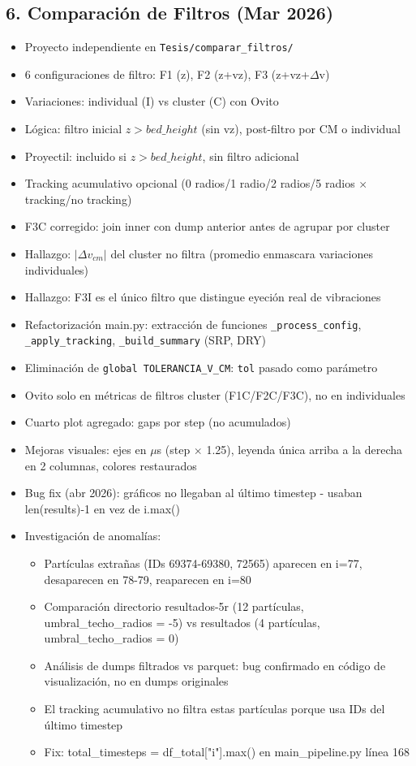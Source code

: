 \documentclass[12pt,a4paper]{article}
\begin{document}
\subsection*{6. Comparación de Filtros (Mar 2026)}
\begin{itemize}
	\item Proyecto independiente en \texttt{Tesis/comparar\_filtros/}
	\item 6 configuraciones de filtro: F1 (z), F2 (z+vz), F3 (z+vz+$\Delta$v)
	\item Variaciones: individual (I) vs cluster (C) con Ovito
	\item Lógica: filtro inicial $z > bed\_height$ (sin vz), post-filtro por CM o individual
	\item Proyectil: incluido si $z > bed\_height$, sin filtro adicional
	\item Tracking acumulativo opcional (0 radios/1 radio/2 radios/5 radios $\times$ tracking/no tracking)
	\item F3C corregido: join inner con dump anterior antes de agrupar por cluster
	\item Hallazgo: $|\Delta v_{cm}|$ del cluster no filtra (promedio enmascara variaciones individuales)
	\item Hallazgo: F3I es el único filtro que distingue eyeción real de vibraciones
	\item Refactorización main.py: extracción de funciones \texttt{\_process\_config}, \texttt{\_apply\_tracking}, \texttt{\_build\_summary} (SRP, DRY)
	\item Eliminación de \texttt{global TOLERANCIA\_V\_CM}: \texttt{tol} pasado como parámetro
	\item Ovito solo en métricas de filtros cluster (F1C/F2C/F3C), no en individuales
	\item Cuarto plot agregado: gaps por step (no acumulados)
	\item Mejoras visuales: ejes en $\mu$s (step $\times$ 1.25), leyenda única arriba a la derecha en 2 columnas, colores restaurados
	\item Bug fix (abr 2026): gráficos no llegaban al último timestep - usaban len(results)-1 en vez de i.max()
	\item Investigación de anomalías:
	      \begin{itemize}
		      \item Partículas extrañas (IDs 69374-69380, 72565) aparecen en i=77, desaparecen en 78-79, reaparecen en i=80
		      \item Comparación directorio resultados-5r (12 partículas, umbral\_techo\_radios = -5) vs resultados (4 partículas, umbral\_techo\_radios = 0)
		      \item Análisis de dumps filtrados vs parquet: bug confirmado en código de visualización, no en dumps originales
		      \item El tracking acumulativo no filtra estas partículas porque usa IDs del último timestep
		      \item Fix: total\_timesteps = df\_total["i"].max() en main\_pipeline.py línea 168
	      \end{itemize}
\end{itemize}
\end{document}

